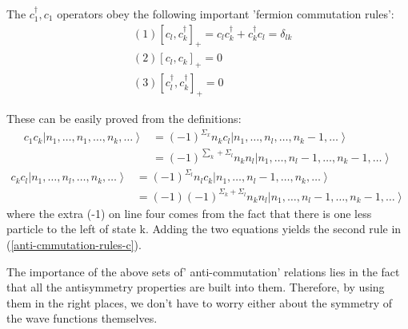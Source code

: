 \begin{imp}
The $c_{1}^{\dagger}, c_{1}$ operators obey the following important 'fermion commutation rules':
\begin{equation}
\begin{aligned}
&(1)\left[c_{l}, c_{k}^{\dagger}\right]_{+}=c_{l} c_{k}^{\dagger}+c_{k}^{\dagger} c_{l}=\delta_{l k}\\
&(2)\left[c_{l}, c_{k}\right]_{+}=0\\
&(3)\left[c_{l}^{\dagger}, c_{k}^{\dagger}\right]_{+}=0
\end{aligned}
\label{anti-cmmutation-rules-c}
\end{equation}
\end{imp}
These can be easily proved from the definitions:
$$\begin{aligned}
c_{1} c_{k}\left|n_{1}, \ldots, n_{1}, \ldots, n_{k}, \ldots\right\rangle &=(-1)^{\Sigma_{x}} n_{k} c_{l}\left|n_{1}, \ldots, n_{l}, \ldots, n_{k}-1, \ldots\right\rangle \\
&=(-1)^{\sum_{k}+\Sigma_{l}} n_{k} n_{l}\left|n_{1}, \ldots, n_{l}-1, \ldots, n_{k}-1, \ldots\right\rangle
\end{aligned}$$
$$\begin{aligned}
c_{k} c_{l}\left|n_{1}, \ldots, n_{l}, \ldots, n_{k}, \ldots\right\rangle &=(-1)^{\Sigma_{l}} n_{l} c_{k}\left|n_{1}, \ldots, n_{l}-1, \ldots, n_{k}, \ldots\right\rangle \\
&=(-1)(-1)^{\Sigma_{k}+\Sigma_{l}} n_{k} n_{l}\left|n_{1}, \ldots, n_{l}-1, \ldots, n_{k}-1, \ldots\right\rangle
\end{aligned}$$
where the extra (-1) on line four comes from the fact that there is one less particle to the left of state k. Adding the two equations yields the second rule in (\ref{anti-cmmutation-rules-c}).

The importance of the above sets of' anti-commutation' relations lies in the fact that all the antisymmetry properties are built into them. Therefore, by using them in the right places, we don't have to worry either about the symmetry of the wave functions themselves.

